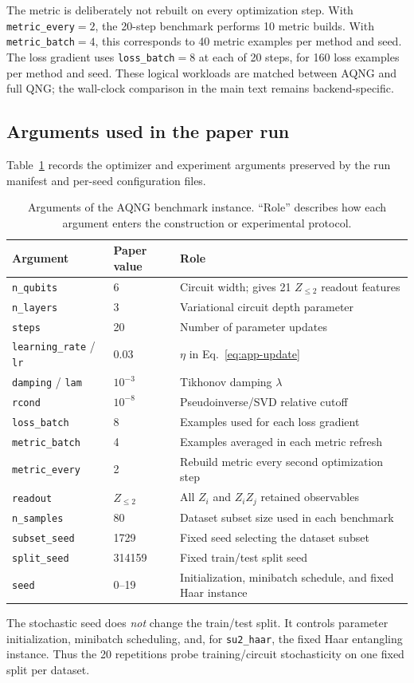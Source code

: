The metric is deliberately not rebuilt on every optimization step.  With \texttt{metric\_every}$=2$, the 20-step benchmark performs 10 metric builds.  With \texttt{metric\_batch}$=4$, this corresponds to 40 metric examples per method and seed.  The loss gradient uses \texttt{loss\_batch}$=8$ at each of 20 steps, for 160 loss examples per method and seed.  These logical workloads are matched between AQNG and full QNG; the wall-clock comparison in the main text remains backend-specific.

\subsection{Arguments used in the paper run}
Table~\ref{tab:aqngargs} records the optimizer and experiment arguments preserved by the run manifest and per-seed configuration files.
\begin{table}
\caption{Arguments of the AQNG benchmark instance.  ``Role'' describes how each argument enters the construction or experimental protocol.}
\label{tab:aqngargs}
\begin{ruledtabular}
\begin{tabular}{lll}
Argument & Paper value & Role\\
\hline
\texttt{n\_qubits} & 6 & Circuit width; gives 21 $Z_{\le2}$ readout features\\
\texttt{n\_layers} & 3 & Variational circuit depth parameter\\
\texttt{steps} & 20 & Number of parameter updates\\
\texttt{learning\_rate} / \texttt{lr} & 0.03 & $\eta$ in Eq.~\eqref{eq:app-update}\\
\texttt{damping} / \texttt{lam} & $10^{-3}$ & Tikhonov damping $\lambda$\\
\texttt{rcond} & $10^{-8}$ & Pseudoinverse/SVD relative cutoff\\
\texttt{loss\_batch} & 8 & Examples used for each loss gradient\\
\texttt{metric\_batch} & 4 & Examples averaged in each metric refresh\\
\texttt{metric\_every} & 2 & Rebuild metric every second optimization step\\
\texttt{readout} & $Z_{\le2}$ & All $Z_i$ and $Z_iZ_j$ retained observables\\
\texttt{n\_samples} & 80 & Dataset subset size used in each benchmark\\
\texttt{subset\_seed} & 1729 & Fixed seed selecting the dataset subset\\
\texttt{split\_seed} & 314159 & Fixed train/test split seed\\
\texttt{seed} & 0--19 & Initialization, minibatch schedule, and fixed Haar instance\\
\end{tabular}
\end{ruledtabular}
\end{table}
The stochastic seed does \emph{not} change the train/test split.  It controls parameter initialization, minibatch scheduling, and, for \texttt{su2\_haar}, the fixed Haar entangling instance.  Thus the 20 repetitions probe training/circuit stochasticity on one fixed split per dataset.

